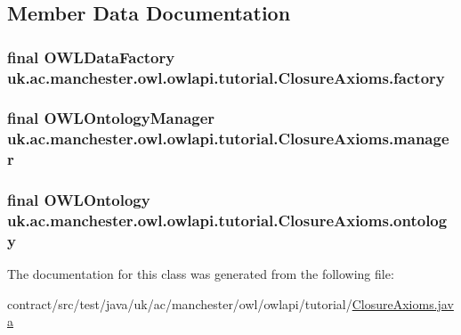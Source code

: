\subsection{Member Data Documentation}
\hypertarget{classuk_1_1ac_1_1manchester_1_1owl_1_1owlapi_1_1tutorial_1_1_closure_axioms_ad52cc8ceb1e6521c3f2acc3847441db3}{
\subsubsection[{factory}]{\setlength{\rightskip}{0pt plus 5cm}final {\bf O\-W\-L\-Data\-Factory} uk.\-ac.\-manchester.\-owl.\-owlapi.\-tutorial.\-Closure\-Axioms.\-factory\hspace{0.3cm}{\ttfamily [private]}}}\label{classuk_1_1ac_1_1manchester_1_1owl_1_1owlapi_1_1tutorial_1_1_closure_axioms_ad52cc8ceb1e6521c3f2acc3847441db3}
\hypertarget{classuk_1_1ac_1_1manchester_1_1owl_1_1owlapi_1_1tutorial_1_1_closure_axioms_a87c0cc6bb9b9c79ba59907765ccb33c1}{
\subsubsection[{manager}]{\setlength{\rightskip}{0pt plus 5cm}final {\bf O\-W\-L\-Ontology\-Manager} uk.\-ac.\-manchester.\-owl.\-owlapi.\-tutorial.\-Closure\-Axioms.\-manager\hspace{0.3cm}{\ttfamily [private]}}}\label{classuk_1_1ac_1_1manchester_1_1owl_1_1owlapi_1_1tutorial_1_1_closure_axioms_a87c0cc6bb9b9c79ba59907765ccb33c1}
\hypertarget{classuk_1_1ac_1_1manchester_1_1owl_1_1owlapi_1_1tutorial_1_1_closure_axioms_ac4350f0dbf6be7810529bcbbcc2c4dff}{
\subsubsection[{ontology}]{\setlength{\rightskip}{0pt plus 5cm}final {\bf O\-W\-L\-Ontology} uk.\-ac.\-manchester.\-owl.\-owlapi.\-tutorial.\-Closure\-Axioms.\-ontology\hspace{0.3cm}{\ttfamily [private]}}}\label{classuk_1_1ac_1_1manchester_1_1owl_1_1owlapi_1_1tutorial_1_1_closure_axioms_ac4350f0dbf6be7810529bcbbcc2c4dff}


The documentation for this class was generated from the following file\-:\begin{DoxyCompactItemize}
\item 
contract/src/test/java/uk/ac/manchester/owl/owlapi/tutorial/\hyperlink{_closure_axioms_8java}{Closure\-Axioms.\-java}\end{DoxyCompactItemize}
